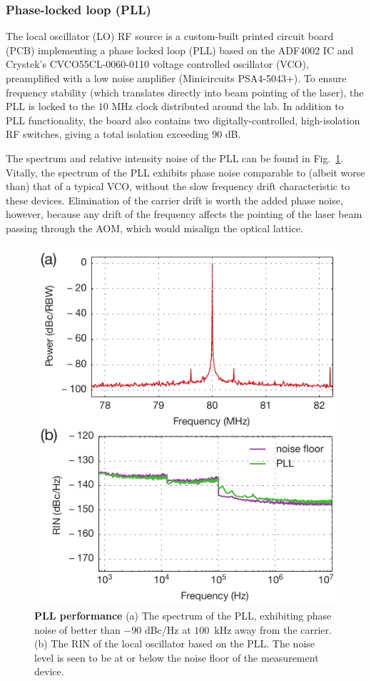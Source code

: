 \documentclass[twocolumn,aps,pra,showpacs,preprintnumbers,bibnotes]{revtex4-1}
\begin{document}
\subsubsection{Phase-locked loop (PLL)}
The local oscillator (LO) RF source is a custom-built printed circuit board (PCB) implementing a phase locked loop (PLL) based on the ADF4002 IC and Crystek's CVCO55CL-0060-0110 voltage controlled oscillator (VCO), preamplified with a low noise amplifier (Minicircuits PSA4-5043+).
To ensure frequency stability (which translates directly into beam pointing of the laser), the PLL is locked to the $10$ MHz clock distributed around the lab.
In addition to PLL functionality, the board also contains two digitally-controlled, high-isolation RF switches, giving a total isolation exceeding $90$ dB.

The spectrum and relative intensity noise of the PLL can be found in Fig.~\ref{fig:pll}.
Vitally, the spectrum of the PLL exhibits phase noise comparable to (albeit worse than) that of a typical VCO, without the slow frequency drift characteristic to these devices.
Elimination of the carrier drift is worth the added phase noise, however, because any drift of the frequency affects the pointing of the laser beam passing through the AOM, which would misalign the optical lattice.

\begin{figure}
  \begin{center}
    \includegraphics{Figure7.pdf}
    \caption{\textbf{PLL performance} (a) The spectrum of the PLL, exhibiting phase noise of better than $-90$ dBc/Hz at $100$~kHz away from the carrier. (b) The RIN of the local oscillator based on the PLL. The noise level is seen to be at or below the noise floor of the measurement device.}\label{fig:pll}
  \end{center}
\end{figure}
\end{document}
